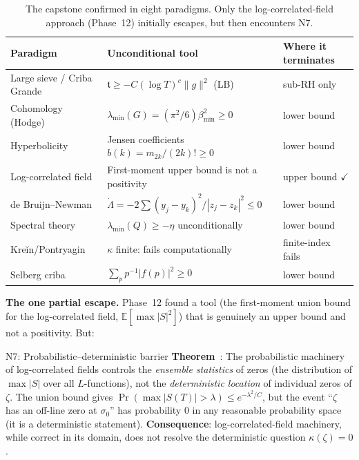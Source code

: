 \documentclass[11pt]{amsart}
\theoremstyle{definition}
\theoremstyle{remark}
\newcommand{\kap}{\kappa}
\newcommand{\sig}{\sigma}
\newcommand{\Lam}{\Lambda}
\begin{document}
\begin{table}[h]
\renewcommand{\arraystretch}{1.4}
\centering
\begin{tabular}{lll}
\toprule
Paradigm & Unconditional tool & Where it terminates \\
\midrule
Large sieve / Criba Grande & $\mathfrak{t}\ge -C(\log T)^c\|g\|^2$ (LB) & sub-RH only \\
Cohomology (Hodge) & $\lambda_{\min}(G) = (\pi^2/6)\beta_{\min}^2 \ge 0$ & lower bound \\
Hyperbolicity & Jensen coefficients $b(k) = m_{2k}/(2k)!\ge 0$ & lower bound \\
Log-correlated field & First-moment upper bound is not a positivity & upper bound $\checkmark$ \\
de Bruijn--Newman & $\dot\Lam = -2\sum(y_j-y_k)^2/|z_j-z_k|^2 \le 0$ & lower bound \\
Spectral theory & $\lambda_{\min}(Q)\ge -\eta$ unconditionally & lower bound \\
Kreĭn/Pontryagin & $\kap$ finite: fails computationally & finite-index fails \\
Selberg criba & $\sum_p p^{-1}|f(p)|^2 \ge 0$ & lower bound \\
\bottomrule
\end{tabular}
\caption{The capstone confirmed in eight paradigms.  Only the log-correlated-field
approach (Phase~12) initially escapes, but then encounters N7.}
\label{tab:capstone}
\end{table}

\noindent\textbf{The one partial escape.}
Phase~12 found a tool (the first-moment union bound for the log-correlated field,
$\mathbb{E}[\max|S|^2]$) that is genuinely an upper bound and not a positivity.
But:

\begin{nogobox}{N7: Probabilistic--deterministic barrier}
\textbf{Theorem}~\cite{RP14}: The probabilistic machinery of log-correlated fields
controls the \emph{ensemble statistics} of zeros (the distribution of $\max|S|$
over all $L$-functions), not the \emph{deterministic location} of individual zeros
of $\zeta$.  The union bound gives $\Pr(\max|S(T)|>\lambda)\le e^{-\lambda^2/C}$,
but the event ``$\zeta$ has an off-line zero at $\sig_0$'' has probability 0 in
any reasonable probability space (it is a deterministic statement).
\textbf{Consequence}: log-correlated-field machinery, while correct in its domain,
does not resolve the deterministic question $\kap(\zeta)=0$.
\end{nogobox}
\end{document}
